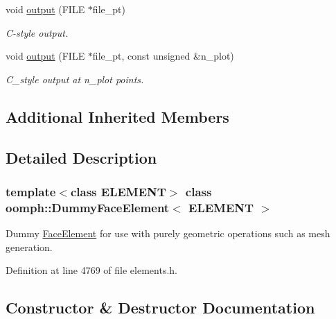 \begin{DoxyCompactItemize}
void \hyperlink{classoomph_1_1DummyFaceElement_ae25eed69d7402d8c88b7bf9f264093a7}{output} (F\+I\+LE $\ast$file\+\_\+pt)
\begin{DoxyCompactList}\small\item\em C-\/style output. \end{DoxyCompactList}\item 
void \hyperlink{classoomph_1_1DummyFaceElement_a47f9db38874cb184f29e19839d0b7e81}{output} (F\+I\+LE $\ast$file\+\_\+pt, const unsigned \&n\+\_\+plot)
\begin{DoxyCompactList}\small\item\em C\+\_\+style output at n\+\_\+plot points. \end{DoxyCompactList}\end{DoxyCompactItemize}
\subsection*{Additional Inherited Members}


\subsection{Detailed Description}
\subsubsection*{template$<$class E\+L\+E\+M\+E\+NT$>$\newline
class oomph\+::\+Dummy\+Face\+Element$<$ E\+L\+E\+M\+E\+N\+T $>$}

Dummy \hyperlink{classoomph_1_1FaceElement}{Face\+Element} for use with purely geometric operations such as mesh generation. 

Definition at line 4769 of file elements.\+h.



\subsection{Constructor \& Destructor Documentation}
\mbox{\label{classoomph_1_1DummyFaceElement_adb775a8739801cf66da2e12b1a04d4d2}} 
